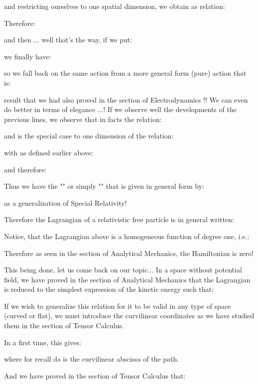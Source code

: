 	and restricting ourselves to one spatial dimension, we obtain as relation:
	
	Therefore:
	
	and then ... well that's the way, if we put:
	
	we finally have:
	
	so we fall back on the same action from a more general form (pure) action that is:
	
	result that we had also proved in the section of Electrodynamics !! We can even do better in terms of elegance ...! If we observe well the developments of the previous lines, we observe that in facts the relation:
	
	and is the special case to one dimension of the relation:
	
	with as defined earlier above:
	
	and therefore:
	
	Thus we have the "\label{fitzgerald lorentz factor}" or simply "" that is given in general form by:
	
	as a generalization of Special Relativity!
	
	Therefore the Lagrangian of a relativistic free particle is in general written:
	
	\begin{tcolorbox}[title=Remark,colframe=black,arc=10pt]
	Notice, that the Lagrangian above is a homogeneous function of degree one, i.e.\label{homogeneous lagrangian of relativistic free particle}:
	
	Therefore as seen in the section of Analytical Mechanics, the Hamiltonian is zero!
	\end{tcolorbox}

	This being done, let us come back on our topic... In a space without potential field, we have proved in the section of Analytical Mechanics that the Lagrangian is reduced to the simplest expression of the kinetic energy such that:
	
	If we wish to generalize this relation for it to be valid in any type of space (curved or flat), we must introduce the curvilinear coordinates as we have studied them in the section of Tensor Calculus.

	In a first time, this gives:
	
	where for recall $\mathrm{d}s$ is the curvilinear abscissa of the path.
	
	And we have proved in the section of Tensor Calculus that:
	
